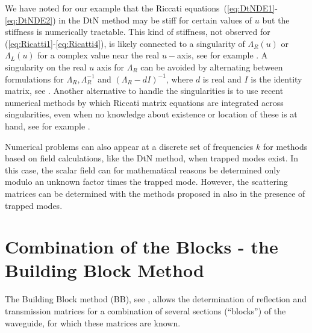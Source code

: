 \documentclass{svjour3}
\renewcommand{\Lambda}{\varLambda}
\renewcommand{\Lambda}{\varLambda}
\begin{document}
We have noted for our example that the Riccati
equations~(\ref{eq:DtNDE1}-\ref{eq:DtNDE2}) in the DtN method may be
stiff for certain values of $u$ but the stiffness is numerically
tractable. This kind of stiffness, not observed for
(\ref{eq:Ricatti1}-\ref{eq:Ricatti4}), is likely connected to a
singularity of $\Lambda_R(u)$ or $\Lambda_L(u)$ for a complex value
near the real $u-$axis, see for example \cite{Fishman:1998}. A
singularity on the real $u$ axis for $\Lambda_R$ can be avoided by
alternating between formulations for $\Lambda_R,\Lambda_R^{-1}$ and
$(\Lambda_R-dI)^{-1}$, where $d$ is real and $I$ is the identity
matrix, see \cite{lu+mclaughlin:2000}. Another alternative to handle
the singularities is to use recent numerical methods by which Riccati
matrix equations are integrated across singularities, even when no
knowledge about existence or location of these is at hand, see for
example \cite{Li-Kahan:2012}.

Numerical problems can also appear at a discrete set of frequencies
$k$ for methods based on field calculations, like the DtN method, when
trapped modes exist. In this case, the scalar field can for
mathematical reasons be determined only modulo an unknown factor times
the trapped mode. However, the scattering matrices can be determined
with the methods proposed in \cite{Nilsson:2002} also in the presence
of trapped modes.




\section{Combination of the Blocks - the Building
 Block Method}
\label{sec:comb-blocks-build}

The Building Block method (BB), see \cite{nilssonbrander1981b}, allows
the determination of reflection and transmission matrices for a
combination of several sections (``blocks'') of the waveguide, for
which these matrices are known.
\end{document}
